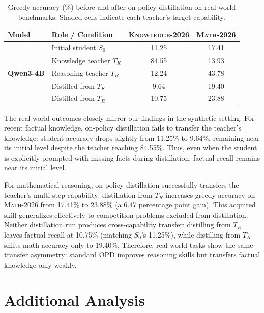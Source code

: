 \documentclass[]{template}
\providecommand{\hi}{\cellcolor{qgreen!18!white}}
\theoremstyle{plain}
\theoremstyle{definition}
\theoremstyle{remark}
\begin{document}
\begin{table}[htbp]
  \centering
  \caption{Greedy accuracy (\%) before and after on-policy distillation  on real-world benchmarks. Shaded cells indicate each teacher's target capability.}
  \label{tab:real-opd}
  \footnotesize
  \setlength{\tabcolsep}{10pt}
  \renewcommand{\arraystretch}{1.15}
  \begin{tabular}{@{}llcc@{}}
    \toprule
    \textbf{Model} & \textbf{Role / Condition} & \textbf{\textsc{Knowledge-2026}} & \textbf{\textsc{Math-2026}} \\
    \midrule
    \multirow{5}{*}{\textbf{Qwen3-4B}}
     & Initial student $S_0$ & 11.25 & 17.41 \\
     \cmidrule(lr){2-4}
     & Knowledge teacher $T_K$ & \hi 84.55 & 13.93 \\
     & Reasoning teacher $T_R$ & 12.24 & \hi 43.78 \\
     \cmidrule(lr){2-4}
     & Distilled from $T_K$ & 9.64 & 19.40 \\
     & Distilled from $T_R$ & 10.75 & 23.88 \\
    \bottomrule
  \end{tabular}
\end{table}

The real-world outcomes closely mirror our findings in the synthetic setting. For recent factual knowledge, on-policy distillation fails to transfer the teacher's knowledge: student accuracy drops slightly from 11.25\% to 9.64\%, remaining near its initial level despite the teacher reaching 84.55\%. Thus, even when the student is explicitly prompted with missing facts during distillation, factual recall remains near its initial level.


For mathematical reasoning, on-policy distillation successfully transfers the teacher's multi-step capability: distillation from $T_R$ increases greedy accuracy on \textsc{Math-2026} from 17.41\% to 23.88\% (a 6.47 percentage point gain). This acquired skill generalizes effectively to competition problems excluded from distillation. Neither distillation run produces cross-capability transfer: distilling from $T_R$ leaves factual recall at 10.75\% (matching $S_0$'s 11.25\%), while distilling from $T_K$ shifts math accuracy only to 19.40\%. Therefore, real-world tasks show the same transfer asymmetry: standard OPD improves reasoning skills but transfers factual knowledge only weakly.



\section{Additional Analysis}
\end{document}
